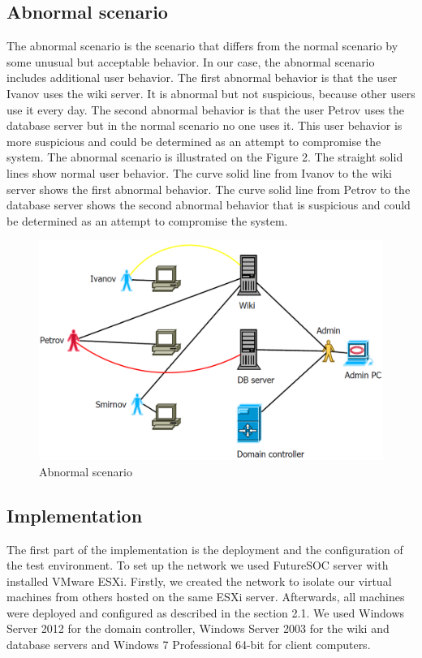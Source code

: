 \subsection{Abnormal scenario}
The abnormal scenario is the scenario that differs from the normal scenario by some unusual but acceptable behavior. In our case, the abnormal scenario includes additional user behavior. The first abnormal behavior is that the user Ivanov uses the wiki server. It is abnormal but not suspicious, because other users use it every day. The second abnormal behavior is that the user Petrov uses the database server but in the normal scenario no one uses it. This user behavior is more suspicious and could be determined as an attempt to compromise the system. The abnormal scenario is illustrated on the Figure 2. The straight solid lines show normal user behavior. The curve solid line from Ivanov to the wiki server shows the first abnormal behavior. The curve solid line from Petrov to the database server shows the second abnormal behavior that is suspicious and could be determined as an attempt to compromise the system. 
\begin{figure}[ht!]
\centering
\includegraphics[width=\textwidth]{scenario_abnormal.png}
\caption{Abnormal scenario}
\label{overflow}
\end{figure}

\subsection{Implementation}
The first part of the implementation is the deployment and the configuration of the test environment. To set up the network we used FutureSOC server with installed VMware ESXi. Firstly, we created the network to isolate our virtual machines from others hosted on the same ESXi server. Afterwards, all machines were deployed and configured as described in the section 2.1. We used Windows Server 2012 for the domain controller, Windows Server 2003 for the wiki and database servers and Windows 7 Professional 64-bit for client computers. 


